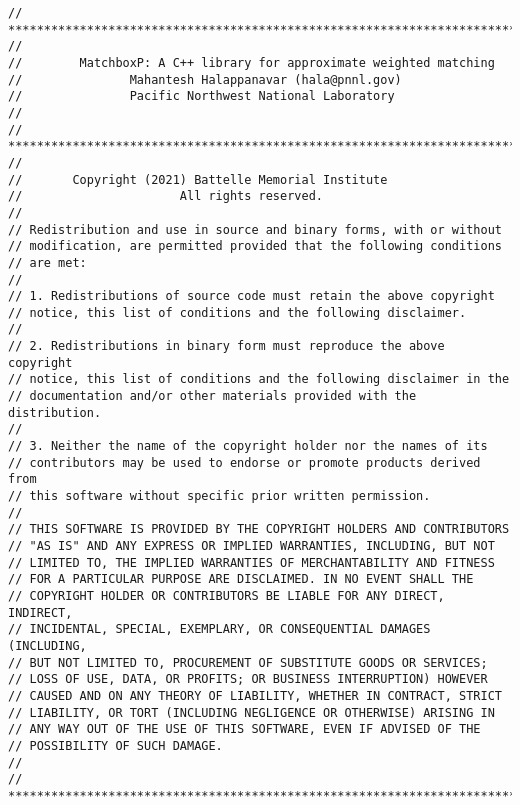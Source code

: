 {\small
\begin{verbatim}
// ***********************************************************************
//
//        MatchboxP: A C++ library for approximate weighted matching
//               Mahantesh Halappanavar (hala@pnnl.gov)
//               Pacific Northwest National Laboratory
//
// ***********************************************************************
//
//       Copyright (2021) Battelle Memorial Institute
//                      All rights reserved.
//
// Redistribution and use in source and binary forms, with or without
// modification, are permitted provided that the following conditions
// are met:
//
// 1. Redistributions of source code must retain the above copyright
// notice, this list of conditions and the following disclaimer.
//
// 2. Redistributions in binary form must reproduce the above copyright
// notice, this list of conditions and the following disclaimer in the
// documentation and/or other materials provided with the distribution.
//
// 3. Neither the name of the copyright holder nor the names of its
// contributors may be used to endorse or promote products derived from
// this software without specific prior written permission.
//
// THIS SOFTWARE IS PROVIDED BY THE COPYRIGHT HOLDERS AND CONTRIBUTORS
// "AS IS" AND ANY EXPRESS OR IMPLIED WARRANTIES, INCLUDING, BUT NOT
// LIMITED TO, THE IMPLIED WARRANTIES OF MERCHANTABILITY AND FITNESS
// FOR A PARTICULAR PURPOSE ARE DISCLAIMED. IN NO EVENT SHALL THE
// COPYRIGHT HOLDER OR CONTRIBUTORS BE LIABLE FOR ANY DIRECT, INDIRECT,
// INCIDENTAL, SPECIAL, EXEMPLARY, OR CONSEQUENTIAL DAMAGES (INCLUDING,
// BUT NOT LIMITED TO, PROCUREMENT OF SUBSTITUTE GOODS OR SERVICES;
// LOSS OF USE, DATA, OR PROFITS; OR BUSINESS INTERRUPTION) HOWEVER
// CAUSED AND ON ANY THEORY OF LIABILITY, WHETHER IN CONTRACT, STRICT
// LIABILITY, OR TORT (INCLUDING NEGLIGENCE OR OTHERWISE) ARISING IN
// ANY WAY OUT OF THE USE OF THIS SOFTWARE, EVEN IF ADVISED OF THE
// POSSIBILITY OF SUCH DAMAGE.
//
// ************************************************************************
\end{verbatim}
}
